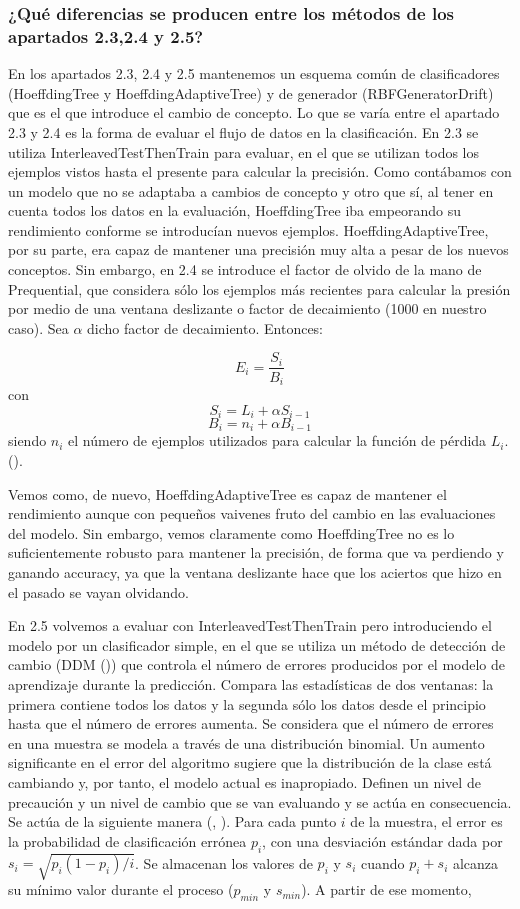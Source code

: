 \subsubsection{¿Qué diferencias se producen entre los métodos de los apartados 2.3,2.4 y 2.5?}

En los apartados 2.3, 2.4 y 2.5 mantenemos un esquema común de clasificadores (HoeffdingTree y HoeffdingAdaptiveTree) y de generador (RBFGeneratorDrift) que es el que introduce el cambio de concepto. Lo que se varía entre el apartado 2.3 y 2.4 es la forma de evaluar el flujo de datos en la clasificación. En 2.3 se utiliza InterleavedTestThenTrain para evaluar, en el que se utilizan todos los ejemplos vistos hasta el presente para calcular la precisión. Como contábamos con un modelo que no se adaptaba a cambios de concepto y otro que sí, al tener en cuenta todos los datos en la evaluación, HoeffdingTree iba empeorando su rendimiento conforme se introducían nuevos ejemplos. HoeffdingAdaptiveTree, por su parte, era capaz de mantener una precisión muy alta a pesar de los nuevos conceptos. Sin embargo, en 2.4 se introduce el factor de olvido de la mano de Prequential, que considera sólo los ejemplos más recientes para calcular la presión por medio de una ventana deslizante o factor de decaimiento (1000 en nuestro caso).  Sea $\alpha$ dicho factor de decaimiento. Entonces:

$$E_i = \frac{S_i}{B_i}$$
con
$$S_i = L_i + \alpha S_{i-1}$$
$$B_i = n_i + \alpha B_{i-1}$$
siendo $n_i$ el número de ejemplos utilizados para calcular la función de pérdida $L_i$. (\cite{moa-manual}).


Vemos como, de nuevo, HoeffdingAdaptiveTree es capaz de mantener el rendimiento aunque con pequeños vaivenes fruto del cambio en las evaluaciones del modelo. Sin embargo, vemos claramente como HoeffdingTree no es lo suficientemente robusto para mantener la precisión, de forma que va perdiendo y ganando accuracy, ya que la ventana deslizante hace que los aciertos que hizo en el pasado se vayan olvidando.

En 2.5 volvemos a evaluar con InterleavedTestThenTrain pero introduciendo el modelo por un clasificador simple, en el que se utiliza un método de detección de cambio (DDM (\cite{ddm})) que controla el número de errores producidos por el modelo de aprendizaje durante la predicción. Compara las estadísticas de dos ventanas: la primera contiene todos los datos y la segunda sólo los datos desde el principio hasta que el número de errores aumenta. Se considera que el número de errores en una muestra se modela a través de una distribución binomial. Un aumento significante en el error del algoritmo sugiere que la distribución de la clase está cambiando y, por tanto, el modelo actual es inapropiado. Definen un nivel de precaución y un nivel de cambio que se van evaluando y se actúa en consecuencia. Se actúa de la siguiente manera (\cite{moa-manual}, \cite{ddm}). Para cada punto $i$ de la muestra, el error es la probabilidad de clasificación errónea $p_i$, con una desviación estándar dada por $s_i = \sqrt{p_i (1-p_i)/i}$. Se almacenan los valores de $p_i$ y $s_i$ cuando $p_i+s_i$ alcanza su mínimo valor durante el proceso ($p_{min}$ y $s_{min}$). A partir de ese momento,

